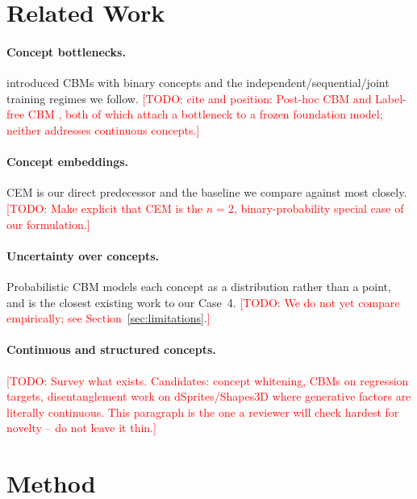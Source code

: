 \documentclass[11pt]{article}
\newcommand{\todo}[1]{\textcolor{red}{[TODO: #1]}}
\begin{document}
\section{Related Work}
\label{sec:related}

\paragraph{Concept bottlenecks.}
\citet{koh2020concept} introduced CBMs with binary concepts and the
independent/sequential/joint training regimes we follow.
\todo{cite and position: Post-hoc CBM \citep{yuksekgonul2023posthoc} and
Label-free CBM \citep{oikarinen2023labelfree}, both of which attach a
bottleneck to a frozen foundation model; neither addresses continuous concepts.}

\paragraph{Concept embeddings.}
CEM \citep{zarlenga2022concept} is our direct predecessor and the baseline we
compare against most closely. \todo{Make explicit that CEM is the $n=2$,
binary-probability special case of our formulation.}

\paragraph{Uncertainty over concepts.}
Probabilistic CBM \citep{kim2023probabilistic} models each concept as a
distribution rather than a point, and is the closest existing work to our
Case~4. \todo{We do not yet compare empirically; see
Section~\ref{sec:limitations}.}

\paragraph{Continuous and structured concepts.}
\todo{Survey what exists. Candidates: concept whitening, CBMs on regression
targets, disentanglement work on dSprites/Shapes3D where generative factors are
literally continuous. This paragraph is the one a reviewer will check hardest
for novelty -- do not leave it thin.}

\section{Method}
\label{sec:method}
\end{document}
